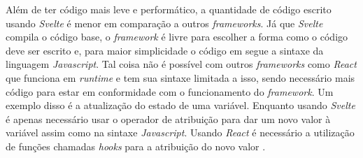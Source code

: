 Além de ter código mais leve e performático, a quantidade de código escrito usando \textit{Svelte} é menor em comparação a outros \textit{frameworks}. Já que \textit{Svelte} compila o código base, o \textit{framework} é livre para escolher a forma como o código deve ser escrito e, para maior simplicidade o código em  segue a sintaxe da linguagem \textit{Javascript}. Tal coisa não é possível com outros \textit{frameworks} como \textit{React} que funciona em \textit{runtime} e tem sua sintaxe limitada a isso, sendo necessário mais código para estar em conformidade com o funcionamento do \textit{framework}. Um exemplo disso é a atualização do estado de uma variável. Enquanto usando \textit{Svelte} é apenas necessário usar o operador de atribuição para dar um novo valor à variável assim como na sintaxe \textit{Javascript}. Usando \textit{React} é necessário a utilização de funções chamadas \textit{hooks} para a atribuição do novo valor \cite{harris_write_2019}.